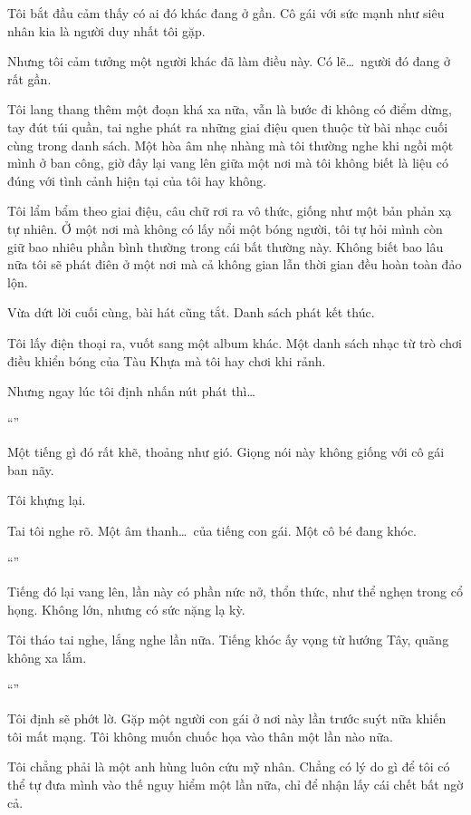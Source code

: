 \documentclass[../main.tex]{subfiles}
\begin{document}
Tôi bắt đầu cảm thấy có ai đó khác đang ở gần. Cô gái với sức mạnh như siêu nhân kia là người duy nhất tôi gặp.

Nhưng tôi cảm tưởng một người khác đã làm điều này. Có lẽ\dots\ người đó đang ở rất gần.

\ct

Tôi lang thang thêm một đoạn khá xa nữa, vẫn là bước đi không có điểm dừng, tay đút túi quần, tai nghe phát ra những giai điệu quen thuộc từ bài nhạc cuối cùng trong danh sách. Một hòa âm nhẹ nhàng mà tôi thường nghe khi ngồi một mình ở ban công, giờ đây lại vang lên giữa một nơi mà tôi không biết là liệu có đúng với tình cảnh hiện tại của tôi hay không.

Tôi lẩm bẩm theo giai điệu, câu chữ rơi ra vô thức, giống như một bản phản xạ tự nhiên. Ở một nơi mà không có lấy nổi một bóng người, tôi tự hỏi mình còn giữ bao nhiêu phần bình thường trong cái bất thường này. Không biết bao lâu nữa tôi sẽ phát điên ở một nơi mà cả không gian lẫn thời gian đều hoàn toàn đảo lộn.

Vừa dứt lời cuối cùng, bài hát cũng tắt. Danh sách phát kết thúc.

Tôi lấy điện thoại ra, vuốt sang một album khác. Một danh sách nhạc từ trò chơi điều khiển bóng của Tàu Khựa mà tôi hay chơi khi rảnh. %

Nhưng ngay lúc tôi định nhấn nút phát thì\dots

``''

Một tiếng gì đó rất khẽ, thoảng như gió. Giọng nói này không giống với cô gái ban nãy.

Tôi khựng lại.

Tai tôi nghe rõ. Một âm thanh\dots\ của tiếng con gái. Một cô bé đang khóc.

``''

Tiếng đó lại vang lên, lần này có phần nức nở, thổn thức, như thể nghẹn trong cổ họng. Không lớn, nhưng có sức nặng lạ kỳ.

Tôi tháo tai nghe, lắng nghe lần nữa. Tiếng khóc ấy vọng từ hướng Tây, quãng không xa lắm.

``''

Tôi định sẽ phớt lờ. Gặp một người con gái ở nơi này lần trước suýt nữa khiến tôi mất mạng. Tôi không muốn chuốc họa vào thân một lần nào nữa.

Tôi chẳng phải là một anh hùng luôn cứu mỹ nhân. Chẳng có lý do gì để tôi có thể tự đưa mình vào thế nguy hiểm một lần nữa, chỉ để nhận lấy cái chết bất ngờ cả.
\end{document}
